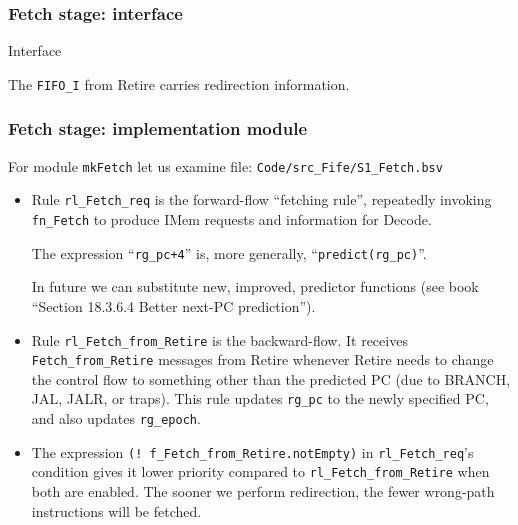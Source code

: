 
\begin{frame}[fragile]
\frametitle{Fetch stage: interface}

\footnotesize

\begin{minipage}{0.725\textwidth}
\end{minipage}
\begin{minipage}{0.25\textwidth}
Interface

\vspace{5ex}

The \verb|FIFO_I| from Retire carries redirection information.

\end{minipage}

\end{frame}


\begin{frame}[fragile]
\frametitle{Fetch stage: implementation module}

\footnotesize

For module {\tt mkFetch} let us examine file: \verb|Code/src_Fife/S1_Fetch.bsv|

\vspace{4ex}

\begin{itemize}

 \item Rule \verb|rl_Fetch_req| is the forward-flow ``fetching rule'',
       repeatedly invoking \verb|fn_Fetch| to produce IMem requests
       and information for Decode.

       The expression ``\verb|rg_pc+4|'' is, more generally,
       ``\verb|predict(rg_pc)|''.

       In future we can substitute new, improved, predictor functions
       (see book ``Section 18.3.6.4 Better next-PC prediction'').

 \item Rule \verb|rl_Fetch_from_Retire| is the backward-flow.  It
       receives \verb|Fetch_from_Retire| messages from Retire whenever
       Retire needs to change the control flow to something other than
       the predicted PC (due to BRANCH, JAL, JALR, or traps).  This
       rule updates \verb|rg_pc| to the newly specified PC, and also
       updates \verb|rg_epoch|.

 \vspace{4ex}

 \item The expression \verb|(! f_Fetch_from_Retire.notEmpty)|
       in \verb|rl_Fetch_req|'s condition gives it lower priority
       compared to \verb|rl_Fetch_from_Retire| when both are enabled.
       The sooner we perform redirection, the fewer wrong-path
       instructions will be fetched.

\end{itemize}

\end{frame}


